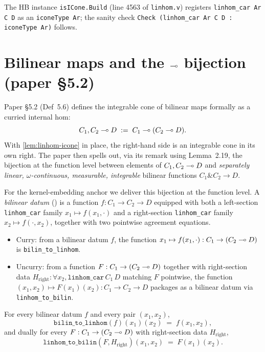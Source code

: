 The HB instance \texttt{isICone.Build} (line 4563 of
\texttt{linhom.v}) registers \texttt{linhom\_car Ar C D} as an
\texttt{iconeType Ar}; the sanity check
\verb|Check (linhom_car Ar C D : iconeType Ar)| follows.

\section{Bilinear maps and the \texorpdfstring{$\multimap$}{->} bijection (paper \S5.2)}%
\label{sec:bilin}

Paper \S5.2 (Def~5.6) defines the integrable cone of bilinear maps
formally as a curried internal hom:
\[
  C_1, C_2 \multimap D \;:=\; C_1 \multimap (C_2 \multimap D).
\]
With \autoref{lem:linhom-icone} in place, the right-hand side is an
integrable cone in its own right. The paper then spells out, via its
remark using Lemma~2.19, the bijection at the function level
between elements of $C_1, C_2 \multimap D$ and \emph{separately linear,
$\omega$-continuous, measurable, integrable} bilinear functions
$C_1 \& C_2 \to D$.

For the kernel-embedding anchor we deliver this bijection at the function level. A
\emph{bilinear datum}
() is a function $f : C_1 \to
C_2 \to D$ equipped with both a left-section
\texttt{linhom\_car} family $x_1 \mapsto f(x_1, \cdot)$ and a
right-section \texttt{linhom\_car} family
$x_2 \mapsto f(\cdot, x_2)$, together with two pointwise
agreement equations.

\begin{definition}
\label{def:bilin-linhom-bij}
\rocqok
{}\rocqok
{}
\begin{itemize}
\item Curry: from a bilinear datum $f$, the function
  $x_1 \mapsto f(x_1, \cdot) : C_1 \to (C_2 \multimap D)$ is
  \texttt{bilin\_to\_linhom}.
\item Uncurry: from a function $F : C_1 \to (C_2 \multimap D)$ together
  with right-section data $H_{\mathrm{right}} : \forall x_2,
  \texttt{linhom\_car}\,C_1\,D$ matching $F$ pointwise, the
  function $(x_1, x_2) \mapsto F(x_1)(x_2) : C_1 \to C_2 \to D$
  packages as a bilinear datum via \texttt{linhom\_to\_bilin}.
\end{itemize}
\end{definition}

\begin{lemma}\label{lem:bilin-roundtrip}
\rocqok
{}\rocqok
{}
For every bilinear datum $f$ and every pair $(x_1, x_2)$,
\[
  \mathtt{bilin\_to\_linhom}(f)(x_1)(x_2) \;=\; f(x_1, x_2),
\]
and dually for every $F : C_1 \to (C_2 \multimap D)$ with right-section
data $H_{\mathrm{right}}$,
\[
  \mathtt{linhom\_to\_bilin}(F, H_{\mathrm{right}})(x_1, x_2)
  \;=\; F(x_1)(x_2).
\]
\end{lemma}


